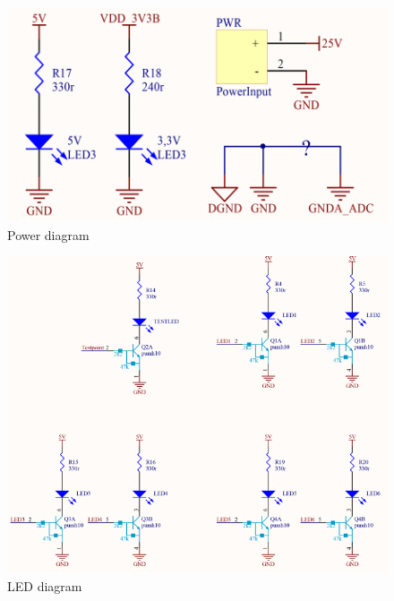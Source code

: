 \begin{figure}[H]
	\centering
	\includegraphics[scale=0.92]{figures/Power.pdf}
	\caption{Power diagram}
	\label{labPower}
\end{figure}\vspace{-5mm}


\begin{figure}[H]
	\centering
	\includegraphics[scale=0.92]{figures/Led.pdf}
	\caption{LED diagram}
	\label{labLed}
\end{figure}\vspace{-5mm}


